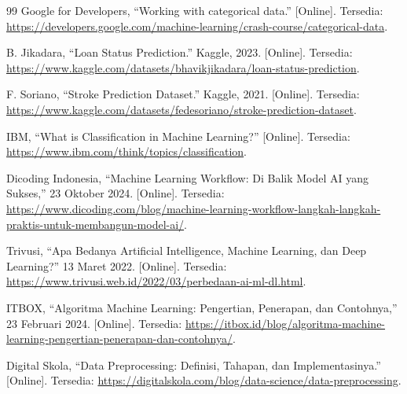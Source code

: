 \documentclass[a4paper,oneside,12pt]{report}
\begin{document}
\begin{thebibliography}{99}
     Google for Developers, ``Working with categorical data.'' [Online]. Tersedia: \url{https://developers.google.com/machine-learning/crash-course/categorical-data}.

     B. Jikadara, ``Loan Status Prediction.'' Kaggle, 2023. [Online]. Tersedia: \url{https://www.kaggle.com/datasets/bhavikjikadara/loan-status-prediction}.

     F. Soriano, ``Stroke Prediction Dataset.'' Kaggle, 2021. [Online]. Tersedia: \url{https://www.kaggle.com/datasets/fedesoriano/stroke-prediction-dataset}.

     IBM, ``What is Classification in Machine Learning?'' [Online]. Tersedia: \url{https://www.ibm.com/think/topics/classification}.

     Dicoding Indonesia, ``Machine Learning Workflow: Di Balik Model AI yang Sukses,'' 23 Oktober 2024. [Online]. Tersedia: \url{https://www.dicoding.com/blog/machine-learning-workflow-langkah-langkah-praktis-untuk-membangun-model-ai/}.

     Trivusi, ``Apa Bedanya Artificial Intelligence, Machine Learning, dan Deep Learning?'' 13 Maret 2022. [Online]. Tersedia: \url{https://www.trivusi.web.id/2022/03/perbedaan-ai-ml-dl.html}.

     ITBOX, ``Algoritma Machine Learning: Pengertian, Penerapan, dan Contohnya,'' 23 Februari 2024. [Online]. Tersedia: \url{https://itbox.id/blog/algoritma-machine-learning-pengertian-penerapan-dan-contohnya/}.

     Digital Skola, ``Data Preprocessing: Definisi, Tahapan, dan Implementasinya.'' [Online]. Tersedia: \url{https://digitalskola.com/blog/data-science/data-preprocessing}.

\end{thebibliography}
\end{document}
